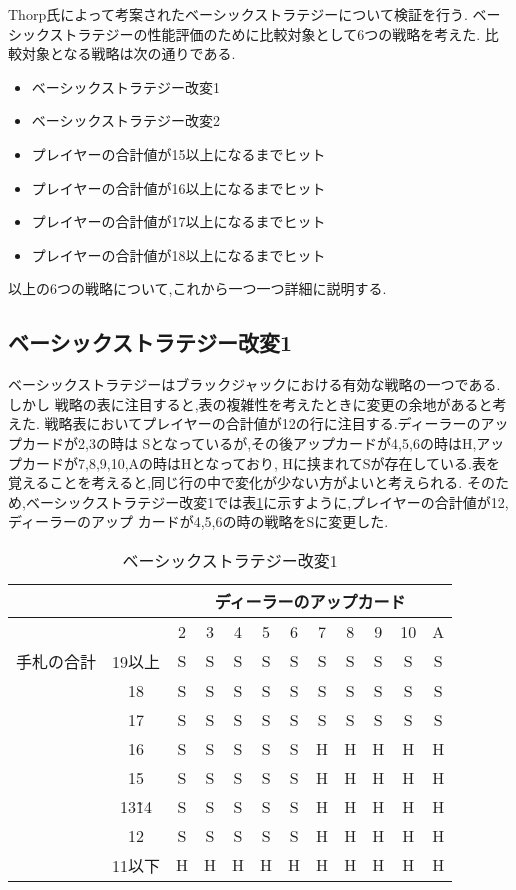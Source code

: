 Thorp氏によって考案されたベーシックストラテジーについて検証を行う.
ベーシックストラテジーの性能評価のために比較対象として6つの戦略を考えた.
比較対象となる戦略は次の通りである.

\begin{itemize}
  \item ベーシックストラテジー改変1
  \item ベーシックストラテジー改変2
  \item プレイヤーの合計値が15以上になるまでヒット
  \item プレイヤーの合計値が16以上になるまでヒット
  \item プレイヤーの合計値が17以上になるまでヒット
  \item プレイヤーの合計値が18以上になるまでヒット
\end{itemize}

以上の6つの戦略について,これから一つ一つ詳細に説明する.

\subsection{ベーシックストラテジー改変1}
ベーシックストラテジーはブラックジャックにおける有効な戦略の一つである.しかし
戦略の表に注目すると,表の複雑性を考えたときに変更の余地があると考えた.
戦略表においてプレイヤーの合計値が12の行に注目する.ディーラーのアップカードが2,3の時は
Sとなっているが,その後アップカードが4,5,6の時はH,アップカードが7,8,9,10,Aの時はHとなっており,
Hに挟まれてSが存在している.表を覚えることを考えると,同じ行の中で変化が少ない方がよいと考えられる.
そのため,ベーシックストラテジー改変1では表\ref{bschange1}に示すように,プレイヤーの合計値が12,ディーラーのアップ
カードが4,5,6の時の戦略をSに変更した.

\begin{table}[htbp]
  \centering
  \caption{ベーシックストラテジー改変1\label{bschange1}}
  \begin{tabular}{|c|c|c|c|c|c|c|c|c|c|c|c|}
    \hline
    \multicolumn{2}{|c|}{} & \multicolumn{10}{|c|}{ディーラーのアップカード} \\ \hline
    \multicolumn{2}{|c|}{} & 2 & 3 & 4 & 5 & 6 & 7 & 8 & 9 & 10 & A \\ \hline
    手札の合計 & 19以上 & S & S & S & S & S & S & S & S & S & S \\ \cline{3-12}
              & 18 & S & S & S & S & S & S & S & S & S & S \\ \cline{3-12}
              & 17 & S & S & S & S & S & S & S & S & S & S \\ \cline{3-12}
              & 16 & S & S & S & S & S & H & H & H & H & H \\ \cline{3-12}
              & 15 & S & S & S & S & S & H & H & H & H & H \\ \cline{3-12}
              & 13\~ 14 & S & S & S & S & S & H & H & H & H & H \\ \cline{3-12}
              & 12 & S & S & S & S & S & H & H & H & H & H \\ \cline{3-12}
              & 11以下 & H & H & H & H & H & H & H & H & H & H \\ \hline
  \end{tabular}
\end{table}

